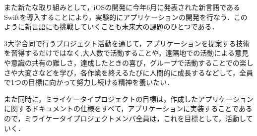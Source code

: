 \par
また新たな取り組みとして，iOSの開発に今年6月に発表された新言語であるSwiftを導入することにより，実験的にアプリケーションの開発を行なう．このように新言語にも挑戦していくことも未来大の課題のひとつである．
\par
3大学合同で行うプロジェクト活動を通じて，アプリケーションを提案する技術を習得するだけではなく,大人数で活動することや，遠隔地での活動による意見や意識の共有の難しさ，達成したときの喜び，グループで活動することでの楽しさや大変さなどを学び，各作業を終えるたびに人間的に成長するなどして，全員で1つの目標に向かって努力し続ける精神を養いたい．
\par
また同時に，ミライケータイプロジェクトの目標は，作成したアプリケーションに関するドキュメントの仕様をすべて，アプリケーションに実装することであるので，ミライケータイプロジェクトメンバ全員は，これを目標として，活動していく．
